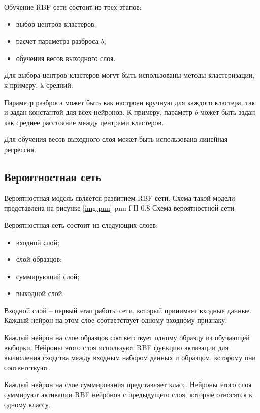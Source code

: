 Обучение RBF сети состоит из трех этапов:
\begin{itemize}
	\item выбор центров кластеров;
	\item расчет параметра разброса $b$;
	\item обучения весов выходного слоя.
\end{itemize}

Для выбора центров кластеров могут быть использованы методы кластеризации, к примеру, k-средний.

Параметр разброса может быть как настроен вручную для каждого кластера, так и задан константой для всех нейронов.
К примеру, параметр $b$ может быть задан как среднее расстояние между центрами кластеров.

Для обучения весов выходного слоя может быть использована линейная регрессия.

\subsection{Вероятностная сеть}
Вероятностная модель является развитием RBF сети. Схема такой модели представлена на рисунке \ref{img:pnn}
{pnn} %
{f} %
{H} %
{0.8\textwidth} %
{Схема вероятностной сети} %

Вероятностная сеть состоит из следующих слоев:
\begin{itemize}
	\item входной слой;
	\item слой образцов;
	\item суммирующий слой;
	\item выходной слой.
\end{itemize}

Входной слой -- первый этап работы сети, который принимает входные данные.
Каждый нейрон на этом слое соответствует одному входному признаку.

Каждый нейрон на слое образцов соответствует одному образцу из обучающей выборки.
Нейроны этого слоя используют RBF функцию активации для вычисления сходства между входным набором данных и образцом, которому они соответствуют.

Каждый нейрон на слое суммирования представляет класс.
Нейроны этого слоя суммируют активации RBF нейронов с предыдущего слоя, которые относятся к одному классу.

